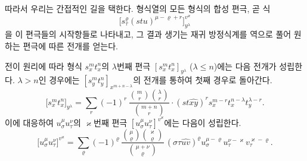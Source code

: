 따라서 우리는 간접적인 길을 택한다. 형식열의 모든 형식의 합성 편극, 곧 식
\[
\bigl[s_\tau^\varrho(stu)^{\mu-\varrho+r}\bigr]_{y^\lambda}^{v^\varkappa}
\]
을 이 편극들의 시작항들로 나타내고, 그 결과 생기는 재귀 방정식계를 역으로 풀어 원하는 편극에 따른 전개를 얻는다.

전이 원리에 따라 형식 $s_x^m t_x^n$의 $\lambda$번째 편극 $[s_x^m t_x^n]_{y^\lambda}$ ($\lambda\le n$)에는 다음 전개가 성립한다. $\lambda>n$인 경우에는 $[s_y^m t_y^n]_{x^{m+n-\lambda}}$의 전개를 통하여 첫째 경우로 돌아간다.
\[
\bigl[s_x^m t_x^n\bigr]_{y^\lambda}
=\sum_r (-1)^r\,
\frac{\binom{m}{r}\binom{\lambda}{r}}{\binom{m+n}{r}}\cdot
(st\widehat{xy})^r s_x^{m-r}t_x^{n-\lambda}t_y^{\lambda-r}.
\]
이에 대응하여 $u_\sigma^\mu u_\tau^\nu$의 $\varkappa$번째 편극 $[u_\sigma^\mu u_\tau^\nu]^{v^\varkappa}$에는 다음이 성립한다.
\[
\bigl[u_\sigma^\mu u_\tau^\nu\bigr]^{v^\varkappa}
=\sum_\varrho (-1)^\varrho\,
\frac{\binom{\mu}{\varrho}\binom{\varkappa}{\varrho}}{\binom{\mu+\nu}{\varrho}}\,
(\sigma\tau\widehat{uv})^\varrho u_\sigma^{\mu-\varrho}u_\tau^{\nu-\varkappa}v_\tau^{\varkappa-\varrho}.
\]

